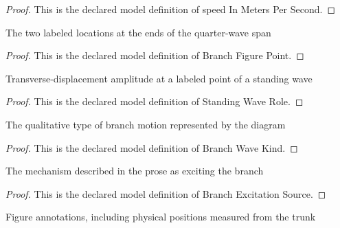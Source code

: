 \begin{proof}
  This is the declared model definition of speed In Meters Per Second.
\end{proof}
\begin{definition}
  \label{def:physics:phyx-mini-0213:phyxminiproblems-problemphyxmini0213-branchfigurepoint}
  The two labeled locations at the ends of the quarter-wave span
\end{definition}
\begin{proof}
  This is the declared model definition of Branch Figure Point.
\end{proof}
\begin{definition}
  \label{def:physics:phyx-mini-0213:phyxminiproblems-problemphyxmini0213-standingwaverole}
  Transverse-displacement amplitude at a labeled point of a standing wave
\end{definition}
\begin{proof}
  This is the declared model definition of Standing Wave Role.
\end{proof}
\begin{definition}
  \label{def:physics:phyx-mini-0213:phyxminiproblems-problemphyxmini0213-branchwavekind}
  The qualitative type of branch motion represented by the diagram
\end{definition}
\begin{proof}
  This is the declared model definition of Branch Wave Kind.
\end{proof}
\begin{definition}
  \label{def:physics:phyx-mini-0213:phyxminiproblems-problemphyxmini0213-branchexcitationsource}
  The mechanism described in the prose as exciting the branch
\end{definition}
\begin{proof}
  This is the declared model definition of Branch Excitation Source.
\end{proof}
\begin{definition}
  \label{def:physics:phyx-mini-0213:phyxminiproblems-problemphyxmini0213-treebranchfigure}
  Figure annotations, including physical positions measured from the trunk
\end{definition}
